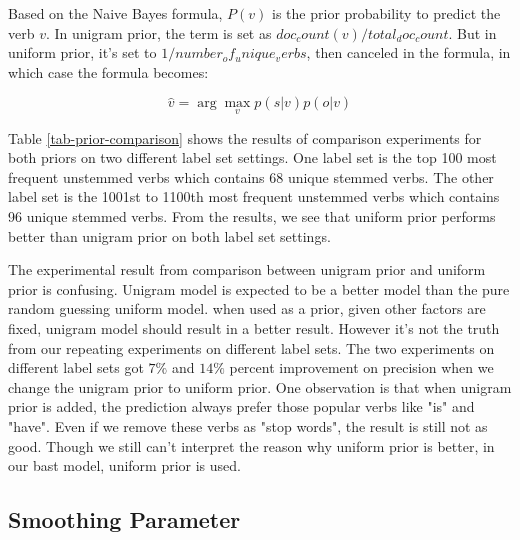Based on the Naive Bayes formula, $P(v)$ is the prior probability to predict the verb $v$. In unigram prior, the term is set as $doc_count(v) / total_doc_count$. But in uniform prior, it's set to $1/number_of_unique_verbs$, then canceled in the formula, in which case the formula becomes:

\begin{equation}
	\hat{v} = \arg\max_v p(s|v)p(o|v)
\end{equation}

Table \ref{tab-prior-comparison} shows the results of comparison experiments for both priors on two different label set settings. One label set is the top 100 most frequent unstemmed verbs which contains 68 unique stemmed verbs. The other label set is the 1001st to 1100th most frequent unstemmed verbs which contains 96 unique stemmed verbs. From the results, we see that uniform prior performs better than unigram prior on both label set settings. 

The experimental result from comparison between unigram prior and uniform prior is confusing. Unigram model is expected to be a better model than the pure random guessing uniform model. when used as a prior, given other factors are fixed, unigram model should result in a better result. However it's not the truth from our repeating experiments on different label sets. The two experiments on different label sets got $7\%$ and $14\%$ percent improvement on precision when we change the unigram prior to uniform prior. One observation is that when unigram prior is added, the prediction always prefer those popular verbs like "is" and "have". Even if we remove these verbs as "stop words", the result is still not as good. Though we still can't interpret the reason why uniform prior is better, in our bast model, uniform prior is used.

\subsection{Smoothing Parameter}

